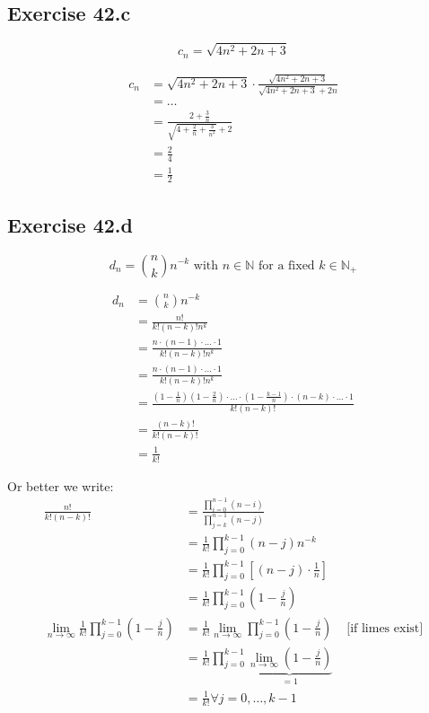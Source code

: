 \documentclass[a4paper]{article}
\theoremstyle{definition}
\begin{document}
\subsection{Exercise 42.c}
\[ c_n = \sqrt{4n^2+2n+3} \]

\begin{align*}
  c_n &= \sqrt{4n^2+2n+3} \cdot \frac{\sqrt{4n^2 + 2n + 3}}{\sqrt{4n^2 + 2n + 3} + 2n} \\
      &= \dots \\
      &= \frac{2 + \frac3n}{\sqrt{4 + \frac2n + \frac3{n^2}} + 2} \\
      &= \frac24 \\
      &= \frac12
\end{align*}

\subsection{Exercise 42.d}
\[ d_n = \binom{n}{k} n^{-k} \text{ with } n \in \mathbb N \text{ for a fixed } k \in \mathbb N_+ \]

\begin{align*}
  d_n &= \binom{n}{k} n^{-k} \\
      &= \frac{n!}{k! (n-k)! n^k} \\
      &= \frac{n \cdot (n-1) \cdot \dots \cdot 1}{k! (n-k)! n^k} \\
      &= \frac{n \cdot (n-1) \cdot \ldots \cdot 1}{k! (n-k)! n^k} \\
      &= \frac{(1 - \frac1n)(1 - \frac2n) \cdot \ldots \cdot (1 - \frac{k-1}{n}) \cdot (n-k) \cdot \ldots \cdot 1}{k! (n-k)!} \\
      &= \frac{(n-k)!}{k! (n-k)!} \\
      &= \frac{1}{k!}
\end{align*}

Or better we write:
\begin{align*}
  \frac{n!}{k! (n-k)!}
    &= \frac{\prod_{i=0}^{n-1} (n-i)}{\prod_{j=k}^{n-1} (n-j)} \\
    &= \frac{1}{k!} \prod_{j=0}^{k-1} (n-j) n^{-k} \\
    &= \frac{1}{k!} \prod_{j=0}^{k-1} \left[(n-j) \cdot \frac1n\right] \\
    &= \frac1{k!} \prod_{j=0}^{k-1} \left(1 - \frac{j}{n}\right) \\
  \lim_{n\to\infty} \frac1{k!} \prod_{j=0}^{k-1} \left(1 - \frac{j}{n}\right)
    &= \frac1{k!} \lim_{n\to\infty} \prod_{j=0}^{k-1} \left(1 - \frac{j}n\right) & \text{ [if limes exist]} \\
    &= \frac1{k!} \prod_{j=0}^{k-1} \underbrace{\lim_{n\to\infty} \left(1 - \frac{j}{n}\right)}_{=1} \\
    &= \frac1{k!} \forall j = 0, \dots, k-1
\end{align*}
\end{document}
